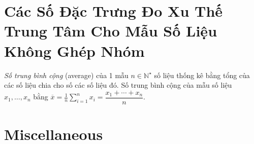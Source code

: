 \documentclass{article}
\begin{document}

\section{Các Số Đặc Trưng Đo Xu Thế Trung Tâm Cho Mẫu Số Liệu Không Ghép Nhóm}
 {\it Số trung bình cộng} (average) của 1 mẫu $n\in\mathbb{N}^\star$ số liệu thống kê bằng tổng của các số liệu chia cho số các số liệu đó. Số trung bình cộng của mẫu số liệu $x_1,\ldots,x_n$ bằng $\overline{x} = \frac{1}{n}\sum_{i=1}^n x_i = \dfrac{x_1 + \cdots + x_n}{n}$.


\section{Miscellaneous}


\printbibliography[heading=bibintoc]
	
\end{document}
